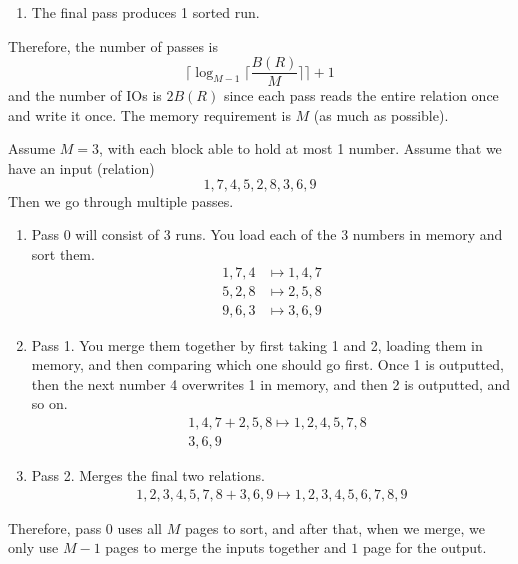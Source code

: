 \documentclass{article}
\begin{document}
\begin{definition}
\begin{enumerate}
        \item The final pass produces 1 sorted run. 
      \end{enumerate}

      Therefore, the number of passes is 
      \begin{equation}
        \bigg\lceil \log_{M-1} \Big\lceil \frac{B(R)}{M} \Big\rceil \bigg\rceil + 1
      \end{equation}
      and the number of IOs is $2 B(R)$ since each pass reads the entire relation once and write it once. The memory requirement is $M$ (as much as possible). 
    \end{definition}

    \begin{example}
      Assume $M = 3$, with each block able to hold at most 1 number. Assume that we have an input (relation) 
      \begin{equation}
        1, 7, 4, 5, 2, 8, 3, 6, 9
      \end{equation}
      Then we go through multiple passes. 
      \begin{enumerate}
        \item Pass 0 will consist of 3 runs. You load each of the 3 numbers in memory and sort them.  
          \begin{align}
            1, 7, 4 & \mapsto 1, 4, 7 \\ 
            5, 2, 8 & \mapsto 2, 5, 8 \\ 
            9, 6, 3 & \mapsto 3, 6, 9
          \end{align}

        \item Pass 1. You merge them together by first taking 1 and 2, loading them in memory, and then comparing which one should go first. Once 1 is outputted, then the next number 4 overwrites 1 in memory, and then 2 is outputted, and so on. 
          \begin{align}
            & 1, 4, 7 + 2, 5, 8 \mapsto 1, 2, 4, 5, 7, 8 \\ 
            & 3, 6, 9
          \end{align}

        \item Pass 2. Merges the final two relations. 
          \begin{align}
            1, 2, 3, 4, 5, 7, 8 + 3, 6, 9 \mapsto 1, 2, 3, 4, 5, 6, 7, 8, 9
          \end{align}
      \end{enumerate}
      Therefore, pass 0 uses all $M$ pages to sort, and after that, when we merge, we only use $M-1$ pages to merge the inputs together and $1$ page for the output. 
    \end{example}
\end{document}
